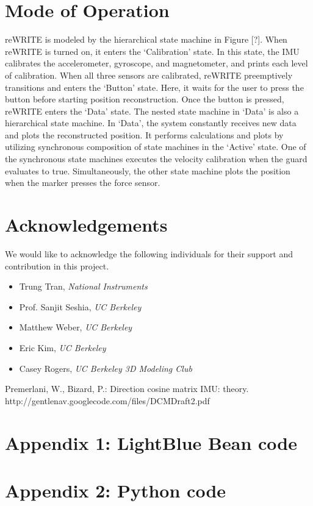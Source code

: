 \documentclass[12pt,journal]{IEEEtran}
\begin{document}
\section{Mode of Operation}
reWRITE is modeled by the hierarchical state machine in Figure [?]. When reWRITE is turned on, it enters the ‘Calibration’ state. In this state, the IMU calibrates the accelerometer, gyroscope, and magnetometer, and prints each level of calibration. When all three sensors are calibrated, reWRITE preemptively transitions and enters the ‘Button’ state. Here, it waits for the user to press the button before starting position reconstruction. Once the button is pressed, reWRITE enters the ‘Data’ state. The nested state machine in ‘Data’ is also a hierarchical state machine. In ‘Data’, the system constantly receives new data and plots the reconstructed position. It performs calculations and plots by utilizing synchronous composition of state machines in the ‘Active’ state. One of the synchronous state machines executes the velocity calibration when the guard evaluates to true. Simultaneously, the other state machine plots the position when the marker presses the force sensor.

\section{Acknowledgements}
We would like to acknowledge the following individuals for their support and contribution in this project.
\begin{itemize}
\item Trung Tran, \textit{National Instruments}
\item Prof. Sanjit Seshia, \textit{UC Berkeley}
\item Matthew Weber, \textit{UC Berkeley}
\item Eric Kim, \textit{UC Berkeley}
\item Casey Rogers, \textit{UC Berkeley 3D Modeling Club}
\end{itemize}

\begin{thebibliography}{1}
 Premerlani, W., Bizard, P.: Direction cosine matrix	IMU: theory. http://gentlenav.googlecode.com/files/DCMDraft2.pdf
\end{thebibliography}

\newpage
\onecolumn

\section{Appendix 1: LightBlue Bean code}
\small{

}

\section{Appendix 2: Python code}
\small{

}
\end{document}
